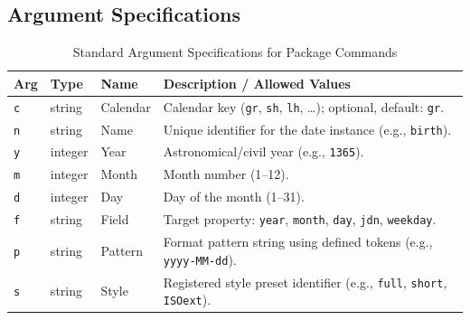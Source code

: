 \documentclass[10pt]{article}
\begin{document}
    \subsection{Argument Specifications}
    \begin{table}[h!]
        \caption{Standard Argument Specifications for Package Commands}
        \label{tab:api-args}
        \vspace{2pt}
        \centering\small
        \begin{tabular}{llll}
            \toprule
            \textbf{Arg} & \textbf{Type} & \textbf{Name} & \textbf{Description / Allowed Values} \\
            \midrule
            \texttt{c}   & string        & Calendar      & Calendar key (\texttt{gr}, \texttt{sh}, \texttt{lh}, \dots); optional, default: \texttt{gr}. \\
            \texttt{n}   & string        & Name          & Unique identifier for the date instance (e.g., \texttt{birth}). \\
            \texttt{y}   & integer       & Year          & Astronomical/civil year (e.g., \texttt{1365}). \\
            \texttt{m}   & integer       & Month         & Month number (1--12). \\
            \texttt{d}   & integer       & Day           & Day of the month (1--31). \\
            \texttt{f}   & string        & Field         & Target property: \texttt{year}, \texttt{month}, \texttt{day}, \texttt{jdn}, \texttt{weekday}. \\
            \texttt{p}   & string        & Pattern       & Format pattern string using defined tokens (e.g., \verb|yyyy-MM-dd|). \\
            \texttt{s}   & string        & Style         & Registered style preset identifier (e.g., \texttt{full}, \texttt{short}, \texttt{ISOext}). \\
            \bottomrule
        \end{tabular}
    \end{table}
    
\end{document}

